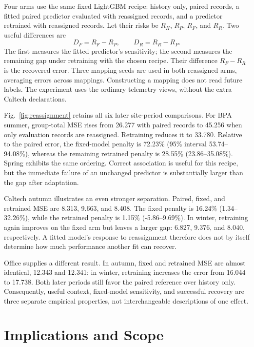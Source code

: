 \documentclass[conference,a4paper]{IEEEtran}
\begin{document}
Four arms use the same fixed LightGBM recipe: history only, paired
records, a fitted paired predictor evaluated with reassigned records, and
a predictor retrained with reassigned records. Let their risks be
$R_H$, $R_P$, $R_F$, and $R_R$. Two useful differences are
\begin{equation}
 D_F=R_F-R_P,\qquad D_R=R_R-R_P.
\end{equation}
The first measures the fitted predictor's sensitivity; the second measures
the remaining gap under retraining with the chosen recipe. Their difference
$R_F-R_R$ is the recovered error. Three mapping seeds are used in both
reassigned arms, averaging errors across mappings. Constructing a mapping
does not read future labels. The experiment uses the ordinary telemetry
views, without the extra Caltech declarations.

Fig.~\ref{fig:reassignment} retains all six later site-period comparisons.
For BPA summer, group-total MSE rises from 26.277 with paired records to
45.256 when only evaluation records are reassigned. Retraining reduces it
to 33.780. Relative to the paired error, the fixed-model penalty is 72.23\%
(95\% interval 53.74--94.08\%), whereas the remaining retrained penalty is
28.55\% (23.86--35.08\%). Spring exhibits the same ordering. Correct
association is useful for this recipe, but the immediate failure of an
unchanged predictor is substantially larger than the gap after adaptation.

Caltech autumn illustrates an even stronger separation. Paired, fixed, and
retrained MSE are 8.313, 9.663, and 8.408. The fixed penalty is 16.24\%
(1.34--32.26\%), while the retrained penalty is 1.15\% (-5.86--9.69\%).
In winter, retraining again improves on the fixed arm but leaves a larger
gap: 6.827, 9.376, and 8.040, respectively. A fitted model's response to
reassignment therefore does not by itself determine how much performance
another fit can recover.

Office supplies a different result. In autumn, fixed and retrained MSE
are almost identical, 12.343 and 12.341; in winter, retraining increases
the error from 16.044 to 17.738. Both later periods still favor the paired
reference over history only. Consequently, useful context, fixed-model
sensitivity, and successful recovery are three separate empirical
properties, not interchangeable descriptions of one effect.

\section{Implications and Scope}
\end{document}
